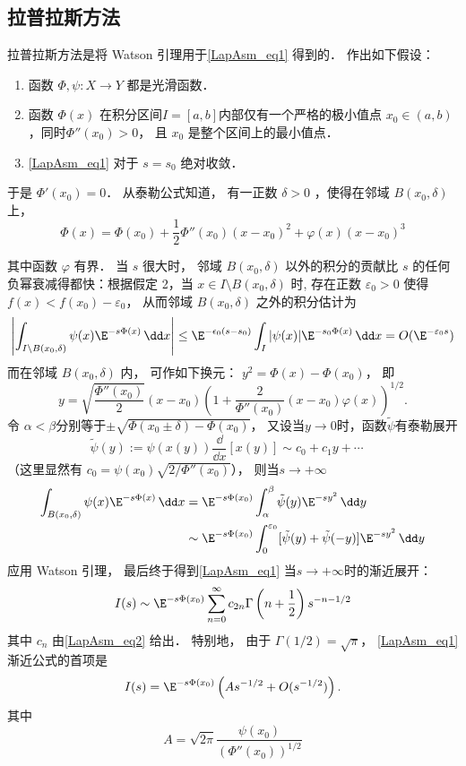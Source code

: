 \subsection{拉普拉斯方法}
拉普拉斯方法是将 Watson 引理用于\autoref{LapAsm_eq1} 得到的． 作出如下假设：

\begin{enumerate}
\item 函数 $\Phi,\psi:X\to Y$ 都是光滑函数．

\item 函数 $\Phi(x)$ 在积分区间$I=[a,b]$内部仅有一个严格的极小值点 $x_0\in(a,b)$，同时$\Phi''(x_0)>0$， 且 $x_0$ 是整个区间上的最小值点．

\item \autoref{LapAsm_eq1} 对于 $s=s_0$ 绝对收敛．
\end{enumerate}

于是 $\Phi'(x_0)=0$． 从泰勒公式知道， 有一正数 $\delta>0$ ，使得在邻域 $B(x_0,\delta)$ 上， 
\[
  \Phi(x)=\Phi(x_0)+\frac{1}{2}\Phi''(x_0)(x-x_0)^2+\varphi(x)(x-x_0)^3
\]

其中函数 $\varphi$ 有界． 当 $s$ 很大时， 邻域 $B(x_0,\delta)$ 以外的积分的贡献比 $s$ 的任何负幂衰减得都快：根据假定 2，当 $x\in I\setminus B(x_0,\delta)$ 时, 存在正数 $\varepsilon_0>0$ 使得 $f(x)<f(x_0)-\varepsilon_0$， 从而邻域 $B(x_0,\delta)$ 之外的积分估计为
\[
  \left|\int_{I\setminus B(x_0,\delta)}\psi(x)\E^{-s\Phi(x)}\,\dd x\right|
  \leq \E^{-\epsilon_0(s-s_0)}\int_I|\psi(x)|\E^{-s_0\Phi(x)}\,\dd x
  =O(\E^{-\varepsilon_0s})
\]
而在邻域 $B(x_0,\delta)$ 内， 可作如下换元： $y^2=\Phi(x)-\Phi(x_0)$， 即
\[
  y=\sqrt{\frac{\Phi''(x_0)}{2}}(x-x_0)\left(1+\frac{2}{\Phi''(x_0)}(x-x_0)\varphi(x)\right)^{1/2}.
\]
令 $\alpha<\beta$分别等于$\pm\sqrt{\Phi(x_0\pm\delta)-\Phi(x_0)}$， 又设当$y\to0$时，函数$\tilde{\psi}$有泰勒展开
\begin{equation}\label{LapAsm_eq2}
\tilde{\psi}(y):=\psi(x(y))\frac{\dd}{\dd x}[x(y)]\sim c_0+c_1y+\cdots \quad 
\end{equation}
（这里显然有 $c_0=\psi(x_0)\sqrt{2/\Phi''(x_0)}$）， 则当$s\to+\infty$
$$
\begin{aligned}
\int_{B(x_0,\delta)}\psi(x)\E^{-s\Phi(x)}\,\dd x
&=\E^{-s\Phi(x_0)}\int_{\alpha}^{\beta}\tilde \psi(y)\E^{-sy^2}\,\dd y\\
&\sim\E^{-s\Phi(x_0)}\int_{0}^{\varepsilon_0}[\tilde \psi(y)+\tilde \psi(-y)]\E^{-sy^2}\,\dd y
\end{aligned}
$$
应用 Watson 引理， 最后终于得到\autoref{LapAsm_eq1} 当$s\to+\infty$时的渐近展开：
\begin{equation}\label{LapAsm_eq3}
  I(s)\sim \E^{-s\Phi(x_0)}\sum_{n=0}^\infty c_{2n}\Gamma\left(n+\frac{1}{2}\right)s^{-n-1/2}
\end{equation}
其中 $c_n$ 由\autoref{LapAsm_eq2} 给出． 特别地， 由于 $\Gamma(1/2)=\sqrt{\pi}$， \autoref{LapAsm_eq1} 渐近公式的首项是
\[
I(s)=\E^{-s\Phi(x_0)}\left(As^{-1/2}+O(s^{-1/2})\right).
\]
其中
\[
  A=\sqrt{2\pi}\frac{\psi(x_0)}{(\Phi''(x_0))^{1/2}}
\]

